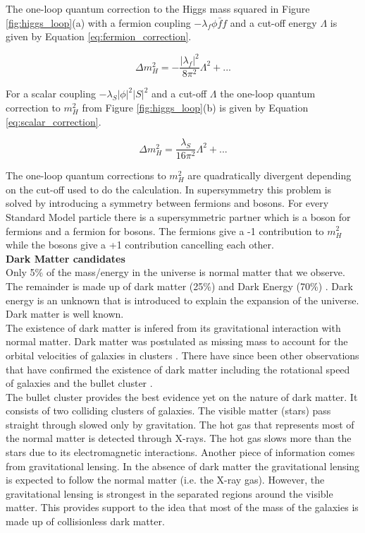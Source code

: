 The one-loop quantum correction to the Higgs mass squared in Figure 
\ref{fig:higgs_loop}(a) with a fermion coupling $-\lambda_{f}\phi\bar{f}f$ and 
a cut-off energy $\Lambda$ is given by Equation \ref{eq:fermion_correction}.

\begin{equation}
\Delta m_{H}^{2} = -\frac{|\lambda_{f}|^{2}}{8\pi^{2}}\Lambda^{2} + ...
\label{eq:fermion_correction}
\end{equation}

For a scalar coupling $-\lambda_{S}|\phi|^{2}|S|^{2}$ and a cut-off $\Lambda$ 
the one-loop quantum correction to $m_{H}^{2}$ from Figure 
\ref{fig:higgs_loop}(b) is given by Equation \ref{eq:scalar_correction}.

\begin{equation}
\Delta m_{H}^{2} = \frac{\lambda_{S}}{16\pi^{2}}\Lambda^{2} + ...
\label{eq:scalar_correction}
\end{equation}

The one-loop quantum corrections to $m_{H}^{2}$ are quadratically divergent
depending on the cut-off used to do the calculation. In supersymmetry this
problem is solved by introducing a symmetry between fermions and bosons. For 
every Standard Model particle there is a supersymmetric partner which is a boson 
for fermions and a fermion for bosons. The fermions give a -1 contribution to 
$m_{H}^{2}$ while the bosons give a +1 contribution cancelling each other. \\

{\bf Dark Matter candidates} \\

Only 5\% of the mass/energy in the universe is normal matter that we observe. 
The remainder is made up of dark matter (25\%) and Dark Energy (70\%) 
\cite{wmap}. Dark energy is an unknown that is introduced to explain the 
expansion of the universe. Dark matter is well known. \\

The existence of dark matter is infered from its gravitational interaction with
normal matter. Dark matter was postulated as missing mass to account for the 
orbital velocities of galaxies in clusters \cite{zwicky}. There have since been 
other observations that have confirmed the existence of dark matter including the 
rotational speed of galaxies \cite{rotation} and the bullet cluster \cite{bullet}. \\

The bullet cluster provides the best evidence yet on the nature of dark matter. 
It consists of two colliding clusters of galaxies. The visible matter (stars) 
pass straight through slowed only by gravitation. The hot gas that represents 
most of the normal matter is detected through X-rays. The hot gas slows more 
than the stars due to its electromagnetic interactions. Another piece of
information comes from gravitational lensing. In the absence of dark matter the
gravitational lensing is expected to follow the normal matter (i.e. the X-ray 
gas). However, the gravitational lensing is strongest in the separated regions
around the visible matter. This provides support to the idea that most of the 
mass of the galaxies is made up of collisionless dark matter. \\

